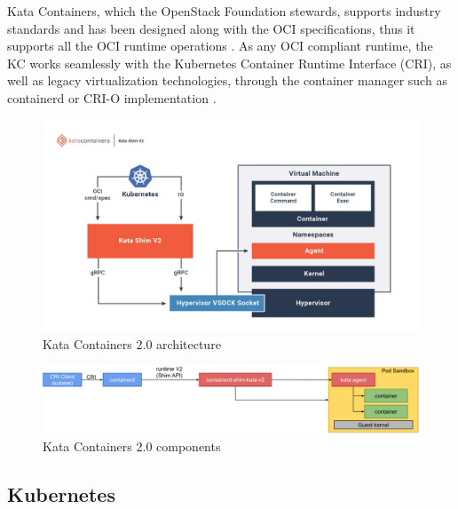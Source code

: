 Kata Containers, which the OpenStack Foundation stewards, supports industry standards and has been designed along with the OCI specifications, thus it supports all the OCI runtime operations \cite{Kumar2020}. As any OCI compliant runtime, the KC works seamlessly with the Kubernetes Container Runtime Interface (CRI)\cite{CRI}, as well as legacy virtualization technologies, through the container manager such as containerd or CRI-O implementation \cite{Randazzo2019}.

\begin{figure}[ht]
  \begin{center}
    \includegraphics[width=13.5cm]{images/KataContainersArchitecture.jpg}
    \caption{Kata Containers 2.0 architecture \cite{KataContainers}}
    \label{fig:KataContainersArchitecture}
  \end{center}
\end{figure}

\begin{figure}[ht]
  \begin{center}
    \includegraphics[width=13.5cm]{images/KataContainersComponents.png}
    \caption{Kata Containers 2.0 components \cite{KataContainersArchitecture}}
    \label{fig:KataContainersComponents}
  \end{center}
\end{figure}

\subsection{Kubernetes}

